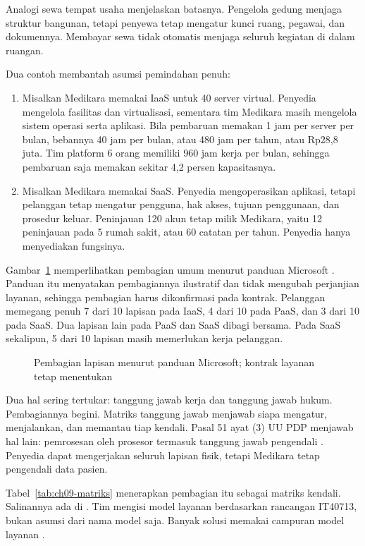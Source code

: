 Analogi sewa tempat usaha menjelaskan batasnya. Pengelola gedung menjaga struktur bangunan, tetapi
penyewa tetap mengatur kunci ruang, pegawai, dan dokumennya. Membayar sewa tidak otomatis menjaga
seluruh kegiatan di dalam ruangan.

Dua contoh membantah asumsi pemindahan penuh:
\begin{enumerate}
  \item Misalkan Medikara memakai IaaS untuk 40 server virtual. Penyedia mengelola fasilitas dan
  virtualisasi, sementara tim Medikara masih mengelola sistem operasi serta aplikasi. Bila pembaruan
  memakan 1 jam per server per bulan, bebannya 40 jam per bulan, atau 480 jam per tahun, atau Rp28,8
  juta. Tim platform 6 orang memiliki 960 jam kerja per bulan, sehingga pembaruan saja memakan
  sekitar 4,2 persen kapasitasnya.
  \item Misalkan Medikara memakai SaaS. Penyedia mengoperasikan aplikasi, tetapi pelanggan tetap
  mengatur pengguna, hak akses, tujuan penggunaan, dan prosedur keluar. Peninjauan 120 akun tetap
  milik Medikara, yaitu 12 peninjauan pada 5 rumah sakit, atau 60 catatan per tahun. Penyedia hanya
  menyediakan fungsinya.
\end{enumerate}

Gambar~\ref{fig:ch09-cloud} memperlihatkan pembagian umum menurut panduan Microsoft
\cite{c09-ms-shared}. Panduan itu menyatakan pembagiannya ilustratif dan tidak mengubah perjanjian
layanan, sehingga pembagian harus dikonfirmasi pada kontrak. Pelanggan memegang penuh 7 dari 10
lapisan pada IaaS, 4 dari 10 pada PaaS, dan 3 dari 10 pada SaaS. Dua lapisan lain pada PaaS dan SaaS
dibagi bersama. Pada SaaS sekalipun, 5 dari 10 lapisan masih memerlukan kerja pelanggan.

\begin{figure}[!htb]
  \centering
  
  \caption{Pembagian lapisan menurut panduan Microsoft; kontrak layanan tetap menentukan}
  \label{fig:ch09-cloud}
\end{figure}

Dua hal sering tertukar: tanggung jawab kerja dan tanggung jawab hukum. Pembagiannya begini. Matriks
tanggung jawab menjawab siapa mengatur, menjalankan, dan memantau tiap kendali. Pasal 51 ayat (3) UU
PDP menjawab hal lain: pemrosesan oleh prosesor termasuk tanggung jawab pengendali
\cite{uu27-2022-pdp}. Penyedia dapat mengerjakan seluruh lapisan fisik, tetapi Medikara tetap
pengendali data pasien.

Tabel~\ref{tab:ch09-matriks} menerapkan pembagian itu sebagai matriks kendali. Salinannya ada di
. Tim mengisi model layanan berdasarkan rancangan
IT40713, bukan asumsi dari nama model saja. Banyak solusi memakai campuran model layanan
\cite{c09-ms-shared}.

